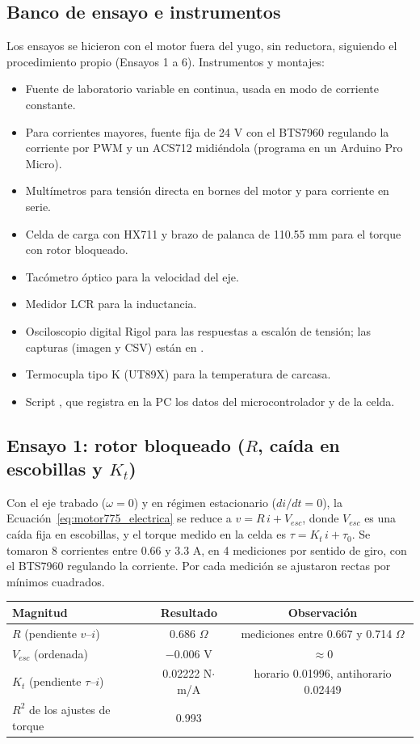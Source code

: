 \subsection{Banco de ensayo e instrumentos}
\label{sec:motor775_banco}
Los ensayos se hicieron con el motor fuera del yugo, sin reductora, siguiendo el procedimiento propio  (Ensayos 1 a 6). Instrumentos y montajes:
\begin{itemize}
\item Fuente de laboratorio variable en continua, usada en modo de corriente constante.
\item Para corrientes mayores, fuente fija de 24 V con el BTS7960 regulando la corriente por PWM y un ACS712 midiéndola (programa  en un Arduino Pro Micro).
\item Multímetros para tensión directa en bornes del motor y para corriente en serie.
\item Celda de carga con HX711 y brazo de palanca de 110.55 mm para el torque con rotor bloqueado.
\item Tacómetro óptico para la velocidad del eje.
\item Medidor LCR para la inductancia.
\item Osciloscopio digital Rigol para las respuestas a escalón de tensión; las capturas (imagen y CSV) están en .
\item Termocupla tipo K (UT89X) para la temperatura de carcasa.
\item Script , que registra en la PC los datos del microcontrolador y de la celda.
\end{itemize}

\subsection{Ensayo 1: rotor bloqueado ($R$, caída en escobillas y $K_t$)}
\label{sec:motor775_e1}
Con el eje trabado ($\omega = 0$) y en régimen estacionario ($di/dt = 0$), la Ecuación~\eqref{eq:motor775_electrica} se reduce a $v = R\,i + V_{esc}$, donde $V_{esc}$ es una caída fija en escobillas, y el torque medido en la celda es $\tau = K_t\,i + \tau_0$. Se tomaron 8 corrientes entre 0.66 y 3.3 A, en 4 mediciones por sentido de giro, con el BTS7960 regulando la corriente. Por cada medición se ajustaron rectas por mínimos cuadrados.

\begin{center}
\begin{tabular}{lcc}\toprule
Magnitud & Resultado & Observación\\\midrule
$R$ (pendiente $v$--$i$) & 0.686 $\Omega$ & mediciones entre 0.667 y 0.714 $\Omega$\\
$V_{esc}$ (ordenada) & $-0.006$ V & $\approx 0$\\
$K_t$ (pendiente $\tau$--$i$) & 0.02222 N$\cdot$m/A & horario 0.01996, antihorario 0.02449\\
$R^2$ de los ajustes de torque & 0.993 & \\\bottomrule
\end{tabular}
\end{center}

